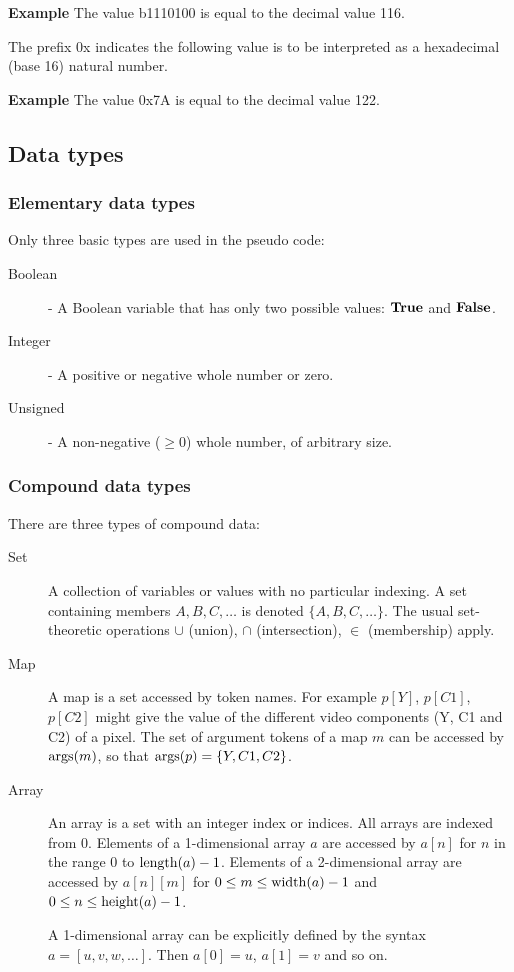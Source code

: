 {\bf Example} The value b1110100 is equal to the decimal value 116. 

The prefix 0x indicates the following value is to be interpreted as a hexadecimal (base 16)
natural number. 

{\bf Example} The value 0x7A is equal to the decimal value 122. 

\subsection{Data types}
\label{datatypes}

\subsubsection{Elementary data types}

Only three basic types are used in the pseudo code:
\begin{description}
\item[Boolean] - A Boolean variable that has only two possible values: $\text{\bf{True}}$ and $\text{\bf{False}}$.
\item[Integer] - A positive or negative whole number or zero.
\item[Unsigned] - A non-negative ($\geq 0$) whole number, of arbitrary size.
\end{description}

\subsubsection{Compound data types}

There are three types of compound data:

\begin{description}
\item[Set] A collection of variables or values with no particular indexing. 
A set containing members $A,B,C,\ldots$ is denoted $\{A,B,C,\ldots\}$. The usual
set-theoretic operations $\cup$ (union), $\cap$ (intersection), $\in$ (membership)
apply.

\item[Map]

A map is a set accessed by token names. For example
$p[Y]$, $p[C1]$, $p[C2]$ might give the value of the different video components
(Y, C1 and C2) of a pixel. The set of argument tokens of a map $m$ can be accessed by $\operatorname{args}(m)$,
so that $\operatorname{args}(p)=\{Y,C1,C2\}$.

\item[Array] 

An array is a set with an integer index or indices. All arrays are indexed from 0. 
Elements of a 1-dimensional array $a$ are accessed by $a[n]$ for $n$ in the
range 0 to $\operatorname{length}(a)-1$. Elements of a 2-dimensional array are accessed by
$a[n][m]$ for $0\leq m\leq\operatorname{width}(a)-1$ and $0\leq n\leq\operatorname{height}(a)-1$.

A 1-dimensional array can be explicitly defined by the syntax $a=[u, v, w, \hdots]$.
Then $a[0]=u$, 
$a[1]=v$ and so on.
\end{description}

